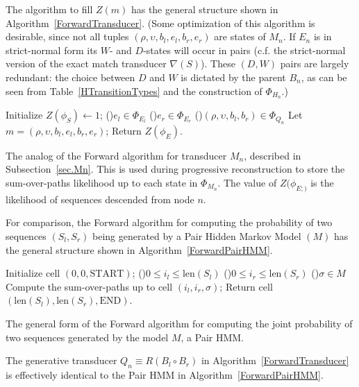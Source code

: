 \documentclass{article}
\newcommand{\secref}[1]{Subsection~\ref{sec.#1}}
\newcommand\compose{}
\newcommand\fork{\circ}
\newcommand\recognize{\nabla}
\newcommand\States{\Phi}
\newcommand\statesof[1]{\States_{#1}}
\newcommand\startstate{\phi_S}
\newcommand\laststate{\phi_E}
\newcommand\laststateof[1]{\phi_{E;#1}}
\newcommand\seqlen[1]{\mbox{len}(#1)}
\newcommand\mstate{(\rho,\upsilon,b_l,e_l,b_r,e_r)}
\newcommand\qstate{(\rho,\upsilon,b_l,b_r)}
\begin{document}
The algorithm to fill $Z(m)$ has the general structure shown in Algorithm~\ref{ForwardTransducer}.
(Some optimization of this algorithm is desirable, since not all tuples $\mstate$ are states of $M_n$.
If $E_n$ is in strict-normal form its $W$- and $D$-states will occur in pairs
(c.f. the strict-normal version of the exact match transducer $\recognize(S)$).
These $(D,W)$ pairs are largely redundant: the choice between $D$ and $W$ is dictated by the parent $B_n$,
as can be seen from Table~\ref{HTransitionTypes} and the construction of $\statesof{H_n}$.)

\begin{algorithm}
  Initialize $Z(\startstate) \leftarrow 1$;
  \BlankLine
  \ForEach(){$e_l \in \statesof{E_l}$} {
    \ForEach(){$e_r \in \statesof{E_r}$} {
      \ForEach(){$\qstate \in \statesof{Q_n}$} {
        Let $m = \mstate$;
        \BlankLine
        \If{$m \in \statesof{M_n}$}{
          Compute $Z(m)$;
        }
      }
    }
  }
  Return $Z(\laststate)$.
\caption{\label{ForwardTransducer}
The analog of the Forward algorithm for transducer $M_n$, described in \secref{Mn}. This is used during progressive reconstruction to store the sum-over-paths likelihood up to each state in $\statesof{M_n}$.  The value of $Z(\laststateof)$ is the likelihood of sequences descended from node $n$. 
}
\end{algorithm}

For comparison, the Forward algorithm for computing the probability of two sequences $(S_l,S_r)$
being generated by a Pair Hidden Markov Model $(M)$ has the general structure shown in Algorithm~\ref{ForwardPairHMM}.

\begin{algorithm}
  Initialize cell $(0,0,\mbox{START})$;
  \BlankLine
  \ForEach(){$0 \leq i_l \leq \seqlen{S_l}$} {
    \ForEach(){$0 \leq i_r \leq \seqlen{S_r}$} {
      \ForEach(){$\sigma \in M$} {
        Compute the sum-over-paths up to cell $(i_l,i_r,\sigma)$;
      }
    }
  }
  Return cell $(\seqlen{S_l},\seqlen{S_r},\mbox{END})$.
\caption{\label{ForwardPairHMM}
The general form of the Forward algorithm for computing the joint probability of two sequences generated by the model $M$, a  Pair HMM.  
}
\end{algorithm}

The generative transducer $Q_n \equiv R \compose (B_l \fork B_r)$
in Algorithm~\ref{ForwardTransducer} is effectively identical to the Pair HMM in Algorithm~\ref{ForwardPairHMM}.
\end{document}
